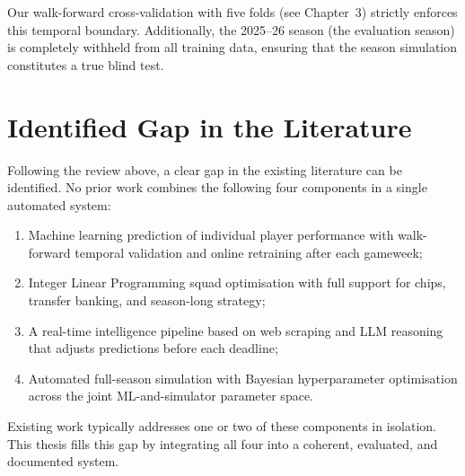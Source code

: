 Our walk-forward cross-validation with five folds (see Chapter~3) strictly enforces this temporal boundary. Additionally, the 2025--26 season (the evaluation season) is completely withheld from all training data, ensuring that the season simulation constitutes a true blind test.

\section{Identified Gap in the Literature}

Following the review above, a clear gap in the existing literature can be identified. No prior work combines the following four components in a single automated system:

\begin{enumerate}
  \item Machine learning prediction of individual player performance with walk-forward temporal validation and online retraining after each gameweek;
  \item Integer Linear Programming squad optimisation with full support for chips, transfer banking, and season-long strategy;
  \item A real-time intelligence pipeline based on web scraping and LLM reasoning that adjusts predictions before each deadline;
  \item Automated full-season simulation with Bayesian hyperparameter optimisation across the joint ML-and-simulator parameter space.
\end{enumerate}

Existing work typically addresses one or two of these components in isolation. This thesis fills this gap by integrating all four into a coherent, evaluated, and documented system.
